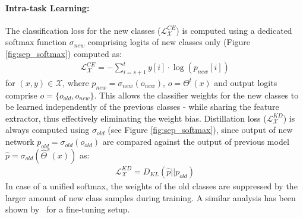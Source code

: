 \documentclass[final]{cvpr}
\begin{document}
\paragraph{Intra-task Learning:}
The classification loss for the new classes ($\mathcal{L}^{CE}_{\mathcal{X}}$) is computed using a dedicated softmax function $\sigma_{new}$ comprising logits of new classes only (Figure \ref{fig:sep_softmax}) computed as: \begin{align}
    \mathcal{L}^{CE}_{\mathcal{X}} = -\sum_{i=s+1}^t y[i]\cdot \log(p_{new}[i]) \label{eq:cls_loss_x}
\end{align}
for $(x,y)\in \mathcal{X}$, where $p_{new} = \sigma_{new}(o_{new})$, $o = \Theta^t(x)$ and output logits comprise $o=\{o_{old}, o_{new}\}$.
This allows the classifier weights for the new classes to be learned independently of the previous classes - while sharing the feature extractor, thus effectively eliminating the weight bias.
Distillation loss ($\mathcal{L}^{KD}_{\mathcal{X}}$) is always computed using $\sigma_{old}$ (see Figure \ref{fig:sep_softmax}), since output of new network $p_{old} = \sigma_{old}(o_{old})$ are compared against the output of previous model $\hat{p}= \sigma_{old}(\hat{\Theta}^s(x))$ as:
\begin{align}
    \mathcal{L}^{KD}_{\mathcal{X}} = D_{KL}( {\hat{p}||p_{old}}) \label{eq:dist_loss_x}
\end{align}
In case of a unified softmax, the weights of the old classes are suppressed by the larger amount of new class samples during training.
A similar analysis has been shown by~\cite{sep_softmax} for a fine-tuning setup. 
\end{document}

